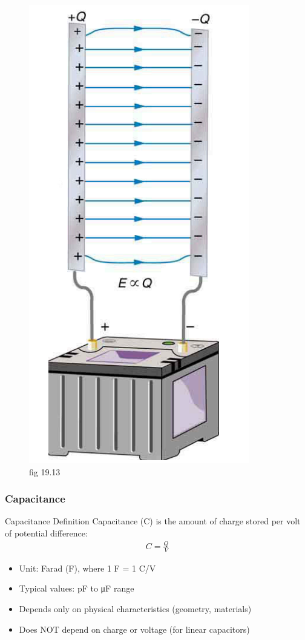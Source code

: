 \documentclass{beamer}
\begin{document}
\begin{frame}
   \begin{figure}
       \centering
       \includegraphics[width=0.3\linewidth]{phys12-circuits-capacitor-symbol.png}
       \caption{fig 19.13}
   \end{figure}
\end{frame}

\begin{frame}
    \frametitle{Capacitance}
    
    \begin{block}{Capacitance Definition}
        Capacitance (C) is the amount of charge stored per volt of potential difference:
        \begin{align}
            C = \frac{Q}{V}
        \end{align}
    \end{block}
    
    \begin{itemize}
        \item Unit: Farad (F), where 1 F = 1 C/V
        \item Typical values: pF to μF range
        \item Depends only on physical characteristics (geometry, materials)
        \item Does NOT depend on charge or voltage (for linear capacitors)
    \end{itemize}
\end{frame}
\end{document}
